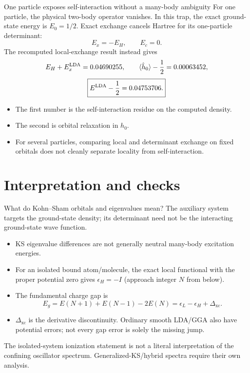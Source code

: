 \documentclass[aspectratio=169,10pt]{beamer}
\newcommand{\avg}[1]{\langle #1\rangle}
\newcommand{\xc}{\mathrm{xc}}
\begin{document}
\begin{frame}{One particle exposes self-interaction without a many-body ambiguity}
For one particle, the physical two-body operator vanishes. In this trap,
the exact ground-state energy is $E_0=1/2$.
Exact exchange cancels Hartree for its one-particle determinant:
\[
 E_x=-E_H,\qquad E_c=0.
\]
The recomputed local-exchange result instead gives
\[
 E_H+E_x^{\rm LDA}=0.04690255,\qquad
 \avg{\hat h_0}-\frac12=0.00063452,
\]
\[
 \boxed{E^{\rm LDA}-\frac12=0.04753706.}
\]
\begin{itemize}
\item The first number is the self-interaction residue on the computed density.
\item The second is orbital relaxation in $h_0$.
\item For several particles, comparing local and determinant exchange on fixed
orbitals does not cleanly separate locality from self-interaction.
\end{itemize}
\end{frame}

\section{Interpretation and checks}
\begin{frame}{What do Kohn--Sham orbitals and eigenvalues mean?}
The auxiliary system targets the ground-state density; its determinant need
not be the interacting ground-state wave function.
\begin{itemize}
\item KS eigenvalue differences are not generally neutral many-body excitation energies.
\item For an isolated bound atom/molecule, the exact local functional with
the proper potential zero gives $\epsilon_H=-I$ (approach integer $N$ from below).
\item The fundamental charge gap is
\[
 E_g=E(N+1)+E(N-1)-2E(N)=\epsilon_L-\epsilon_H+\Delta_{\xc}.
\]
\item $\Delta_{\xc}$ is the derivative discontinuity. Ordinary smooth LDA/GGA
also have potential errors; not every gap error is solely the missing jump.
\end{itemize}
The isolated-system ionization statement is not a literal interpretation of
the confining oscillator spectrum. Generalized-KS/hybrid spectra require
their own analysis.
\end{frame}
\end{document}
